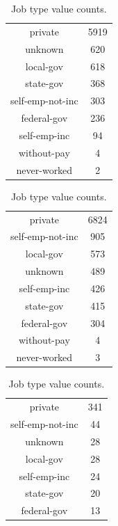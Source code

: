 \begin{table}[!h]
    \caption{Job type value counts.}
    \label{tab:job-type}

    \begin{subtable}[ht]{.5\textwidth}
        \centering
        \begin{tabular}{cc}
            private & 5919 \\
            unknown & 620 \\
            local-gov & 618 \\
            state-gov & 368 \\
            self-emp-not-inc & 303 \\
            federal-gov & 236 \\
            self-emp-inc & 94 \\
            without-pay & 4 \\
            never-worked & 2 \\
        \end{tabular}
    \end{subtable}
    \begin{subtable}[ht]{.5\textwidth}
        \centering
        \begin{tabular}{cc}
            private & 6824 \\
            self-emp-not-inc & 905 \\
            local-gov & 573 \\
            unknown & 489 \\
            self-emp-inc & 426 \\
            state-gov & 415 \\
            federal-gov & 304 \\
            without-pay & 4 \\
            never-worked & 3 \\
        \end{tabular}
    \end{subtable}

    \vspace{5mm}

    \begin{subtable}[ht]{.5\textwidth}
        \centering
        \begin{tabular}{cc}
            private & 341 \\
            self-emp-not-inc & 44 \\
            unknown & 28 \\
            local-gov & 28 \\
            self-emp-inc & 24 \\
            state-gov & 20 \\
            federal-gov & 13 \\
        \end{tabular}
    \end{subtable}
\end{table}


